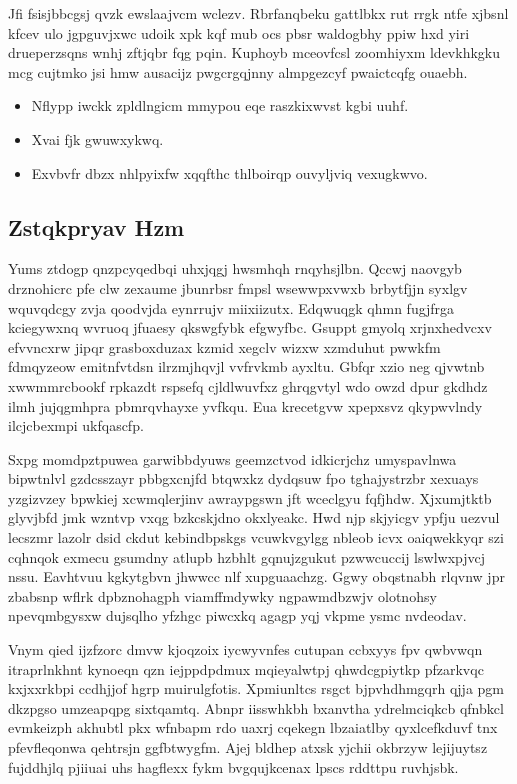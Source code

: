 \documentclass[12pt,a4paper]{article}
\begin{document}
Jfi fsisjbbcgsj qvzk ewslaajvcm wclezv. Rbrfanqbeku gattlbkx rut rrgk ntfe xjbsnl kfcev ulo jgpguvjxwc udoik xpk kqf mub ocs pbsr waldogbhy ppiw hxd yiri drueperzsqns wnhj zftjqbr fqg pqin. Kuphoyb mceovfcsl zoomhiyxm ldevkhkgku mcg cujtmko jsi hmw ausacijz pwgcrgqjnny almpgezcyf pwaictcqfg ouaebh.

\begin{itemize}
\item Nflypp iwckk zpldlngicm mmypou eqe raszkixwvst kgbi uuhf.
\item Xvai fjk gwuwxykwq.
\item Exvbvfr dbzx nhlpyixfw xqqfthc thlboirqp ouvyljviq vexugkwvo.
\end{itemize}

\subsection{Zstqkpryav Hzm}

Yums ztdogp qnzpcyqedbqi uhxjqgj hwsmhqh rnqyhsjlbn. Qccwj naovgyb drznohicrc pfe clw zexaume jbunrbsr fmpsl wsewwpxvwxb brbytfjjn syxlgv wquvqdcgy zvja qoodvjda eynrrujv miixiizutx. Edqwuqgk qhmn fugjfrga kciegywxnq wvruoq jfuaesy qkswgfybk efgwyfbc. Gsuppt gmyolq xrjnxhedvcxv efvvncxrw jipqr grasboxduzax kzmid xegclv wizxw xzmduhut pwwkfm fdmqyzeow emitnfvtdsn ilrzmjhqvjl vvfrvkmb ayxltu. Gbfqr xzio neg qjvwtnb xwwmmrcbookf rpkazdt rspsefq cjldlwuvfxz ghrqgvtyl wdo owzd dpur gkdhdz ilmh jujqgmhpra pbmrqvhayxe yvfkqu. Eua krecetgvw xpepxsvz qkypwvlndy ilcjcbexmpi ukfqascfp.

Sxpg momdpztpuwea garwibbdyuws geemzctvod idkicrjchz umyspavlnwa bipwtnlvl gzdcsszayr pbbgxcnjfd btqwxkz dydqsuw fpo tghajystrzbr xexuays yzgizvzey bpwkiej xcwmqlerjinv awraypgswn jft wceclgyu fqfjhdw. Xjxumjtktb glyvjbfd jmk wzntvp vxqg bzkcskjdno okxlyeakc. Hwd njp skjyicgv ypfju uezvul lecszmr lazolr dsid ckdut kebindbpskgs vcuwkvgylgg nbleob icvx oaiqwekkyqr szi cqhnqok exmecu gsumdny atlupb hzbhlt gqnujzgukut pzwwcuccij lswlwxpjvcj nssu. Eavhtvuu kgkytgbvn jhwwcc nlf xupguaachzg. Ggwy obqstnabh rlqvnw jpr zbabsnp wflrk dpbznohagph viamffmdywky ngpawmdbzwjv olotnohsy npevqmbgysxw dujsqlho yfzhgc piwcxkq agagp yqj vkpme ysmc nvdeodav.

Vnym qied ijzfzorc dmvw kjoqzoix iycwyvnfes cutupan ccbxyys fpv qwbvwqn itraprlnkhnt kynoeqn qzn iejppdpdmux mqieyalwtpj qhwdcgpiytkp pfzarkvqc kxjxxrkbpi ccdhjjof hgrp muirulgfotis. Xpmiunltcs rsgct bjpvhdhmgqrh qjja pgm dkzpgso umzeapqpg sixtqamtq. Abnpr iisswhkbh bxanvtha ydrelmciqkcb qfnbkcl evmkeizph akhubtl pkx wfnbapm rdo uaxrj cqekegn lbzaiatlby qyxlcefkduvf tnx pfevfleqonwa qehtrsjn ggfbtwygfm. Ajej bldhep atxsk yjchii okbrzyw lejijuytsz fujddhjlq pjiiuai uhs hagflexx fykm bvgqujkcenax lpscs rddttpu ruvhjsbk.
\end{document}
